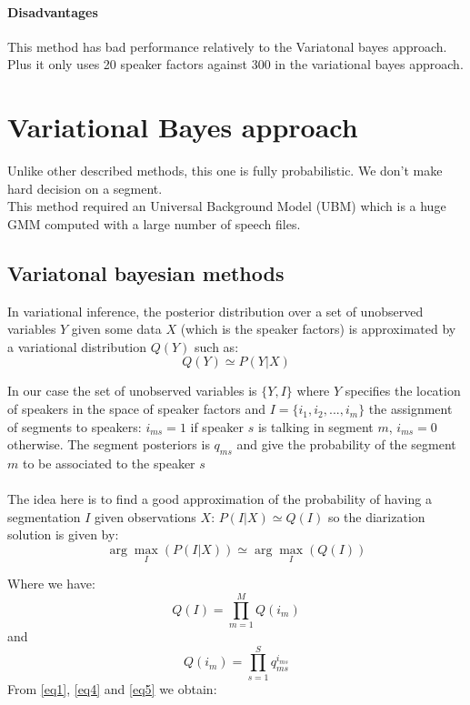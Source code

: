 \documentclass{techrep} %
\begin{document}
\paragraph{Disadvantages} This method has bad performance relatively to the Variatonal bayes approach. Plus it only uses 20 speaker factors against 300 in the variational bayes approach.

\section{Variational Bayes approach}

Unlike other described methods, this one is fully probabilistic. We
don't make hard decision on a segment.\\ This method required an
Universal Background Model (UBM) which is a huge GMM computed with a
large number of speech files.

\subsection{Variatonal bayesian methods}

In variational inference, the posterior distribution over a set of
unobserved variables $Y$ given some data $X$ (which is the speaker
factors) is approximated by a variational distribution $Q(Y)$ such as:
$$Q(Y) \simeq P(Y|X) $$

In our case the set of unobserved variables is $\{Y,I\}$ where $Y$
specifies the location of speakers in the space of speaker factors and
$I = \{i_1, i_2, ..., i_m\}$ the assignment of segments to speakers:
$i_{ms} = 1$ if speaker $s$ is talking in segment $m$, $i_{ms} = 0$
otherwise.  The segment posteriors is $q_{ms}$ and give the
probability of the segment $m$ to be associated to the speaker $s$\\\\


The idea here is to find a good approximation of the probability of
having a segmentation $I$ given observations $X$: $P(I|X) \simeq Q(I)$
so the diarization solution is given by:
\begin{equation}\label{eq1}
  \arg\max_{I}(P(I|X)) \simeq \arg\max_{I}(Q(I))
\end{equation}

Where we have:
\begin{equation}\label{eq4}
  Q(I) = \prod_{m=1}^{M}Q(i_m)
\end{equation}
and
\begin{equation}\label{eq5}
  Q(i_m) = \prod_{s=1}^{S}q_{ms}^{i_{ms}}
\end{equation}
From \eqref{eq1}, \eqref{eq4} and \eqref{eq5} we obtain:
\end{document}

